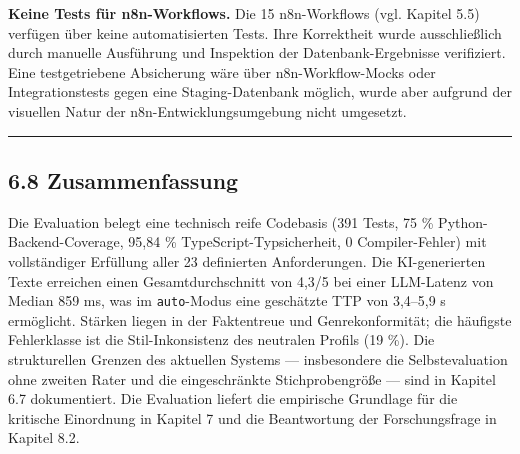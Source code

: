 \textbf{Keine Tests für n8n-Workflows.} Die 15 n8n-Workflows (vgl.
Kapitel 5.5) verfügen über keine automatisierten Tests. Ihre Korrektheit
wurde ausschließlich durch manuelle Ausführung und Inspektion der
Datenbank-Ergebnisse verifiziert. Eine testgetriebene Absicherung wäre
über n8n-Workflow-Mocks oder Integrationstests gegen eine
Staging-Datenbank möglich, wurde aber aufgrund der visuellen Natur der
n8n-Entwicklungsumgebung nicht umgesetzt.

\begin{center}\rule{0.5\linewidth}{0.5pt}\end{center}

\subsection{6.8 Zusammenfassung}\label{zusammenfassung}

Die Evaluation belegt eine technisch reife Codebasis (391 Tests, 75 \%
Python-Backend-Coverage, 95,84 \% TypeScript-Typsicherheit, 0
Compiler-Fehler) mit vollständiger Erfüllung aller 23 definierten
Anforderungen. Die KI-generierten Texte erreichen einen
Gesamtdurchschnitt von 4,3/5 bei einer LLM-Latenz von Median 859 ms, was
im \passthrough{\lstinline!auto!}-Modus eine geschätzte TTP von 3,4--5,9
s ermöglicht. Stärken liegen in der Faktentreue und Genrekonformität;
die häufigste Fehlerklasse ist die Stil-Inkonsistenz des neutralen
Profils (19 \%). Die strukturellen Grenzen des aktuellen Systems ---
insbesondere die Selbstevaluation ohne zweiten Rater und die
eingeschränkte Stichprobengröße --- sind in Kapitel 6.7 dokumentiert.
Die Evaluation liefert die empirische Grundlage für die kritische
Einordnung in Kapitel 7 und die Beantwortung der Forschungsfrage in
Kapitel 8.2.
